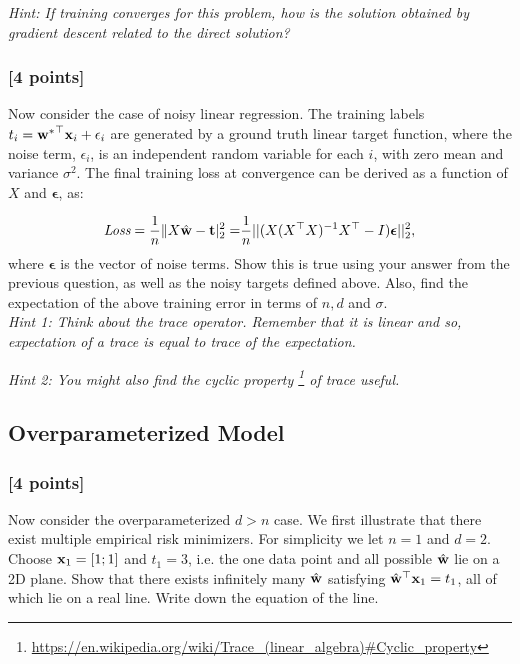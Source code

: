 \documentclass[11pt]{article}
\begin{document}
    \noindent \emph{Hint: If training converges for this problem, how is the solution obtained by gradient descent related to the direct solution?}
    
   
   \subsubsection{{\color{blue}[4 points]}} \label{sec:n_reg}
    Now consider the case of noisy linear regression. The training labels $t_i = {\mathbf{w}^*}^\top\mathbf{x}_i + \epsilon_i$ are generated by a ground truth linear target function, where the noise term, $\epsilon_i$, is an independent random variable for each $i$, with zero mean and variance $\sigma^2$. The final training loss at convergence can be derived as a function of $X$ and $\boldsymbol{\epsilon}$, as:
    
    \begin{align*}
         \textit{Loss} = \frac{1}{n}\|X\hat{\mathbf{w}}-\mathbf{t}|_2^2 = &\frac{1}{n} || (X(X^\top X)^{-1}X^\top - I)\boldsymbol{\epsilon} ||^2_2, \\
    \end{align*}
    where $\boldsymbol{\epsilon}$ is the vector of noise terms.
    Show this is true using your answer from the previous question, as well as the noisy targets defined above. Also, find the expectation of the above training error in terms of $n, d$ and $\sigma$. \\
        
    \noindent \emph{Hint 1: Think about the trace operator. Remember that it is linear and so, expectation of a trace is equal to trace of the expectation.}
    
    \noindent \emph{Hint 2: You might also find the cyclic property \footnote{\url{https://en.wikipedia.org/wiki/Trace_(linear_algebra)\#Cyclic_property}} of trace useful. }

   
   \subsection{Overparameterized Model}
   
   \subsubsection{{\color{blue}[4 points]} }
   Now consider the overparameterized $d>n$ case. We first illustrate that there exist multiple empirical risk minimizers.
   For simplicity we let $n=1$ and $d=2$.
   Choose $\mathbf{x}_1 = [1;1]$ and $t_1 = 3$, i.e. the one data point and all possible $\hat{\mathbf{w}}$ lie on a 2D plane.
   Show that there exists infinitely many $\hat{\mathbf{w}}$ satisfying $\hat{\mathbf{w}}^\top\mathbf{x}_1=t_1$, all of which lie on a real line.
   Write down the equation of the line.
   
\end{document}
